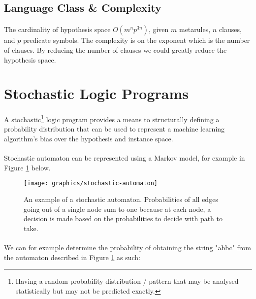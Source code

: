 \documentclass{article}
\theoremstyle{plain}
\theoremstyle{definition}
\begin{document}
\begin{multicols}{2}
\subsection{Language Class \& Complexity}

\paragraph{} The cardinality of hypothesis space $O(m^n p^{3n})$, given $m$ metarules, $n$ clauses, and $p$ predicate symbols. The complexity is on the exponent which is the number of clauses. By reducing the number of clauses we could greatly reduce the hypothesis space.

\section{Stochastic Logic Programs}

\paragraph{} A stochastic\footnote{Having a random probability distribution / pattern that may be analysed statistically but may not be predicted exactly.} logic program provides a means to structurally defining a probability distribution that can be used to represent a machine learning algorithm's bias over the hypothesis and instance space\cite{muggleton96}. 

\paragraph{} Stochastic automaton can be represented using a Markov model, for example in Figure \ref{fig:StochasticAutomaton} below.

\begin{figure}[H]
\texttt{[image: graphics/stochastic-automaton]}
\caption{An example of a stochastic automaton. Probabilities of all edges going out of a single node sum to one because at each node, a decision is made based on the probabilities to decide with path to take.}\label{fig:StochasticAutomaton}
\end{figure}

\paragraph{} We can for example determine the probability of obtaining the string "abbc" from the automaton described in Figure \ref{fig:StochasticAutomaton} as such: 


\end{multicols}
\end{document}
